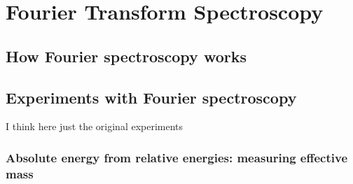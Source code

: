 
\renewcommand{\thechapter}{5}

\chapter{Fourier Transform Spectroscopy}

\section{How Fourier spectroscopy works}
\section{Experiments with Fourier spectroscopy}
I think here just the original experiments

\subsection{Absolute energy from relative energies: measuring effective mass}


